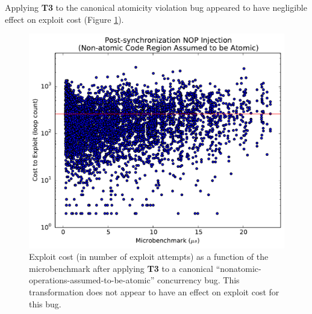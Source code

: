 Applying \textbf{T3} to the canonical atomicity violation bug appeared to have negligible effect on exploit cost (Figure \ref{fig_nonatomic-post}). 
\begin{figure}
	\centering
	\includegraphics[width=\columnwidth]{figures/nonatomic-post}
	\caption{
		Exploit cost (in number of exploit attempts) as a function of the microbenchmark after applying \textbf{T3} to a canonical ``nonatomic-operations-assumed-to-be-atomic'' concurrency bug.
		This transformation does not appear to have an effect on exploit cost for this bug.
	}
	\label{fig_nonatomic-post}
\end{figure}

